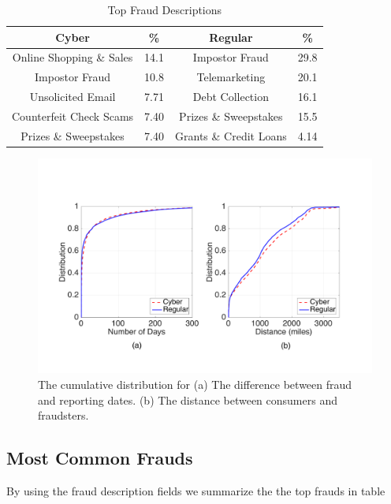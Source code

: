 \documentclass[conference]{IEEEtran}
\begin{document}
\begin{table}[h]
\centering
\begin{tabular}{c|c||c|c}
\hline
\bfseries Cyber & \bfseries \% & \bfseries Regular & \bfseries \% \\
\hline
\hline
Online Shopping \& Sales & 14.1 & Impostor Fraud & 29.8\\
\hline
Impostor Fraud & 10.8 & Telemarketing & 20.1\\
\hline
Unsolicited Email & 7.71 & Debt Collection & 16.1\\
\hline
Counterfeit Check Scams	 & 7.40 & Prizes \& Sweepstakes & 15.5 \\
\hline
Prizes \& Sweepstakes & 7.40 & Grants \& Credit Loans & 4.14\\
\hline
\hline
\end{tabular}
\vspace{8pt}
\caption{Top Fraud Descriptions}\label{topfrauds}
\vspace{-15pt}
\end{table}




\begin{figure}[t]
\centering
  \includegraphics[scale=0.28]{graphics/dist_days.pdf}
  \caption{The cumulative distribution for (a) The difference between fraud and reporting dates. (b) The distance between consumers and fraudsters.}
  \label{cdffig}
\end{figure}


\subsection{Most Common Frauds}\label{fraudsters}

By using the fraud description fields we summarize the the top frauds in table 
\end{document}
